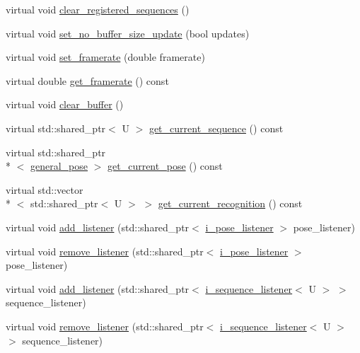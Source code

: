 \begin{DoxyCompactItemize}
virtual void \hyperlink{classmae_1_1movement__controller_ac1fd2fc2b97bbc404e08f535647c47e9}{clear\-\_\-registered\-\_\-sequences} ()
\item 
virtual void \hyperlink{classmae_1_1movement__controller_a32f047751311a4e179d7cdad365bcadc}{set\-\_\-no\-\_\-buffer\-\_\-size\-\_\-update} (bool updates)
\item 
virtual void \hyperlink{classmae_1_1movement__controller_a6f99fd37e6d7459d311ba3cbcccbdea1}{set\-\_\-framerate} (double framerate)
\item 
virtual double \hyperlink{classmae_1_1movement__controller_af7f0769f77719733e2c73b9830d670fa}{get\-\_\-framerate} () const 
\item 
virtual void \hyperlink{classmae_1_1movement__controller_a694dc82c3222059711fa3a2ac6eb8ec2}{clear\-\_\-buffer} ()
\item 
virtual std\-::shared\-\_\-ptr$<$ U $>$ \hyperlink{classmae_1_1movement__controller_a8047034c7af70d1be6c63a33c8c7192c}{get\-\_\-current\-\_\-sequence} () const 
\item 
virtual std\-::shared\-\_\-ptr\\*
$<$ \hyperlink{classmae_1_1general__pose}{general\-\_\-pose} $>$ \hyperlink{classmae_1_1movement__controller_af6d4e2103bb880f25e43b93b6d83053a}{get\-\_\-current\-\_\-pose} () const 
\item 
virtual std\-::vector\\*
$<$ std\-::shared\-\_\-ptr$<$ U $>$ $>$ \hyperlink{classmae_1_1movement__controller_a58a04cf526d0deeffa7d4820619c41b5}{get\-\_\-current\-\_\-recognition} () const 
\item 
virtual void \hyperlink{classmae_1_1movement__controller_a7a150591c820312528d5b11e32646455}{add\-\_\-listener} (std\-::shared\-\_\-ptr$<$ \hyperlink{classmae_1_1i__pose__listener}{i\-\_\-pose\-\_\-listener} $>$ pose\-\_\-listener)
\item 
virtual void \hyperlink{classmae_1_1movement__controller_a5d77a42ac7427ae562d042ebbc6ce30b}{remove\-\_\-listener} (std\-::shared\-\_\-ptr$<$ \hyperlink{classmae_1_1i__pose__listener}{i\-\_\-pose\-\_\-listener} $>$ pose\-\_\-listener)
\item 
virtual void \hyperlink{classmae_1_1movement__controller_ade907e35d832e9ec5ec6fc2797df882f}{add\-\_\-listener} (std\-::shared\-\_\-ptr$<$ \hyperlink{classmae_1_1i__sequence__listener}{i\-\_\-sequence\-\_\-listener}$<$ U $>$ $>$ sequence\-\_\-listener)
\item 
virtual void \hyperlink{classmae_1_1movement__controller_af8e7fed43a0b64d09b7fbb22052ba635}{remove\-\_\-listener} (std\-::shared\-\_\-ptr$<$ \hyperlink{classmae_1_1i__sequence__listener}{i\-\_\-sequence\-\_\-listener}$<$ U $>$ $>$ sequence\-\_\-listener)

\end{DoxyCompactItemize}

